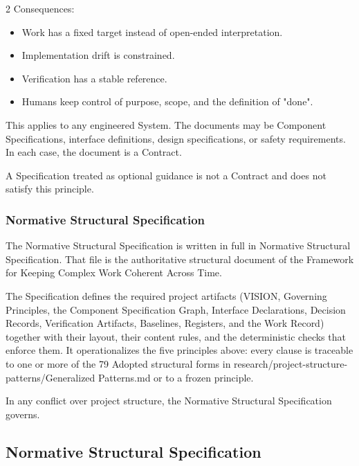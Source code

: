 \begin{multicols}{2}
Consequences:

\begin{itemize}\setlength{\itemsep}{0pt}\setlength{\parskip}{0pt}

\item Work has a fixed target instead of open-ended interpretation.

\item Implementation drift is constrained.

\item Verification has a stable reference.

\item Humans keep control of purpose, scope, and the definition of "done".

\end{itemize}

This applies to any engineered System. The documents may be Component Specifications, interface definitions, design specifications, or safety requirements. In each case, the document is a Contract.

A Specification treated as optional guidance is not a Contract and does not satisfy this principle.

\subsubsection*{Normative Structural Specification}

The Normative Structural Specification is written in full in Normative Structural Specification. That file is the authoritative structural document of the Framework for Keeping Complex Work Coherent Across Time.

The Specification defines the required project artifacts (VISION, Governing Principles, the Component Specification Graph, Interface Declarations, Decision Records, Verification Artifacts, Baselines, Registers, and the Work Record) together with their layout, their content rules, and the deterministic checks that enforce them. It operationalizes the five principles above: every clause is traceable to one or more of the 79 Adopted structural forms in research/project-structure-patterns/Generalized Patterns.md or to a frozen principle.

In any conflict over project structure, the Normative Structural Specification governs.

\end{multicols}

\clearpage
\subsection{Normative Structural Specification}
\label{app:spec}


